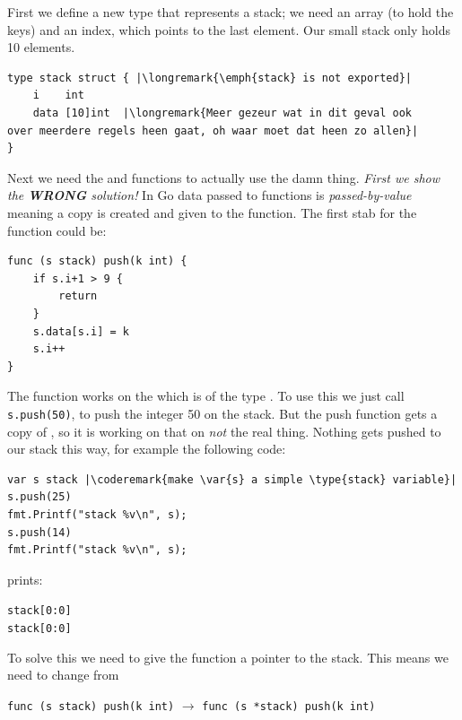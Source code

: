 \begin{Answer}

\Question 
First we define a new type that represents a stack; we need an
array (to hold the keys) and an index, which points to the last element.
Our small stack only holds 10 elements.

\begin{lstlisting}
type stack struct { |\longremark{\emph{stack} is not exported}|
    i    int 
    data [10]int  |\longremark{Meer gezeur wat in dit geval ook
over meerdere regels heen gaat, oh waar moet dat heen zo allen}|
}
\end{lstlisting}

\showremarks

Next we need the  and  functions to actually
use the damn thing. \emph{First we show the \textbf{WRONG} solution!}
In Go data passed to functions is \emph{passed-by-value} meaning a copy
is created and given to the function. The first stab for the function
 could be:

\begin{lstlisting}
func (s stack) push(k int) {
	if s.i+1 > 9 {
		return
	}
	s.data[s.i] = k
	s.i++
}
\end{lstlisting}
The function works on the  which is of the type . To
use this we just call \lstinline{s.push(50)}, to push the integer 50 on
the stack. But the push function gets a copy of , so it is
working on that on \emph{not} the real thing. Nothing gets pushed to our
stack this way, for example the following code:

\begin{lstlisting}
var s stack |\coderemark{make \var{s} a simple \type{stack} variable}|
s.push(25)
fmt.Printf("stack %v\n", s);
s.push(14)
fmt.Printf("stack %v\n", s);
\end{lstlisting}
prints:
\begin{alltt}
stack [0:0]
stack [0:0]
\end{alltt}

To solve this we need to give the function  a pointer
to the stack. This means we need to change  from

\lstinline{func (s stack) push(k int)} 
$\rightarrow$
\lstinline{func (s *stack) push(k int)}


\end{Answer}
